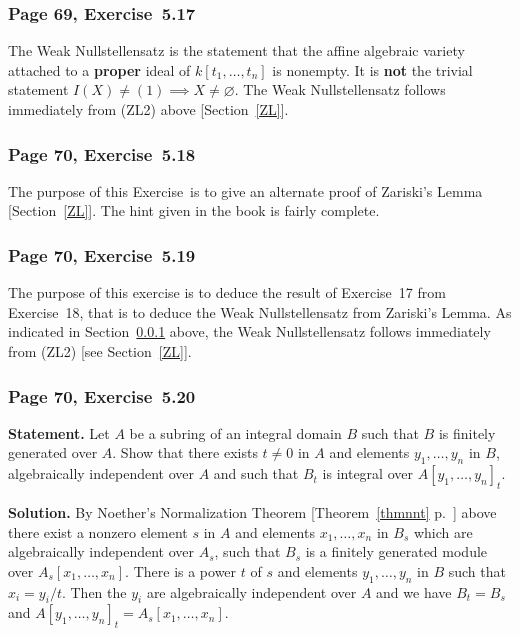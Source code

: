 \documentclass[12pt,letterpaper]{article}%
\newcommand{\nn}{\noindent}
\begin{document}
\subsubsection{Page 69, Exercise~5.17}\label{ex5.17}%

The Weak Nullstellensatz is the statement that the affine algebraic variety attached to a \textbf{proper} ideal of $k[t_1,\ldots,t_n]$ is nonempty. It is \textbf{not} the trivial statement $I(X)\ne(1)\implies X\ne\varnothing$. The Weak Nullstellensatz follows immediately from (ZL2) above [Section~\ref{ZL}].

\subsubsection{Page 70, Exercise~5.18}%

The purpose of this Exercise~is to give an alternate proof of Zariski's Lemma [Section~\ref{ZL}]. The hint given in the book is fairly complete.

\subsubsection{Page 70, Exercise~5.19}%

The purpose of this exercise is to deduce the result of Exercise~17 from Exercise~18, that is to deduce the Weak Nullstellensatz from Zariski's Lemma. As indicated in Section~\ref{ex5.17} above, the Weak Nullstellensatz follows immediately from (ZL2) [see Section~\ref{ZL}].

\subsubsection{Page 70, Exercise~5.20}%

\textbf{Statement.} Let $A$ be a subring of an integral domain $B$ such that $B$ is finitely generated over $A$. Show that there exists $t\ne0$ in $A$ and elements $y_1,\ldots,y_n$ in $B$, algebraically independent over $A$ and such that $B_t$ is integral over $A[y_1,\ldots,y_n]_t$.

\nn\textbf{Solution.} By Noether's Normalization Theorem [Theorem~\ref{thmnnt} p.~\pageref{thmnnt}] above %
there exist a nonzero element $s$ in $A$ and elements $x_1,\dots,x_n$ in $B_s$ which are algebraically independent over $A_s$, such that $B_s$ is a finitely generated module over $A_s[x_1,\dots,x_n]$. There is a power $t$ of $s$ and elements $y_1,\ldots,y_n$ in $B$ such that $x_i=y_i/t$. Then the $y_i$ are algebraically independent over $A$ and we have $B_t=B_s$ and $A[y_1,\ldots,y_n]_t=A_s[x_1,\dots,x_n]$.
\end{document}
